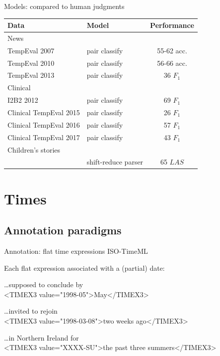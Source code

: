 \documentclass[12pt,compress]{beamer}
\newcommand{\smallcite}[1]{{\scriptsize\parencite{#1}}}
\begin{document}
\begin{frame}{Models: compared to human judgments}
\begin{tabular}{ l l c }
\hline\hline
Data & Model & Performance \\
\hline
News \\
\hline
TempEval 2007 & pair classify & 55-62 acc. \\
TempEval 2010 & pair classify & 56-66 acc. \\
TempEval 2013 & pair classify & 36 $F_1$ \\
\hline
\pause
Clinical \\
\hline
I2B2 2012 & pair classify & 69 $F_1$ \\
Clinical TempEval 2015 & pair classify & 26 $F_1$ \\
Clinical TempEval 2016 & pair classify & 57 $F_1$ \\
Clinical TempEval 2017 & pair classify & 43 $F_1$ \\
\hline
\pause
Children's stories \\
\hline
\cite{kolomiyets-etal:2012:ACL} & shift-reduce parser & 65 $LAS$ \\
\hline\hline
\end{tabular}
\end{frame}


\section{Times}


\subsection{Annotation paradigms}


\begin{frame}{Annotation: flat time expressions}
\alert{%
ISO-TimeML \smallcite{pustejovsky2010iso}
\hfill
{}}
\bigskip

Each flat expression associated with a (partial) date\pause:

\ttfamily\small
\bigskip
\ldots supposed to conclude by \\
\textless TIMEX3 value="1998-05"\textgreater May\textless/TIMEX3\textgreater

\pause
\bigskip
\ldots invited to rejoin \\
\textless TIMEX3 value="1998-03-08"\textgreater two weeks ago\textless/TIMEX3\textgreater

\pause
\bigskip
\ldots in Northern Ireland for \\
\textless TIMEX3 value="XXXX-SU"\textgreater the past three summers\textless/TIMEX3\textgreater
\end{frame}
\end{document}
